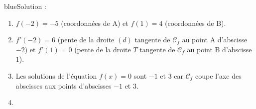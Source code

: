 \begin{color}{blue}Solution :\par
\begin{enumerate}
\item $f(-2) = -5$ (coordonnées de A) et $f(1) = 4$ (coordonnées de B).
\item $f'(-2) = 6$ (pente de la droite $(d)$ tangente de $\mathcal{C}_f$ au point A d'abscisse $-2$) et $f'(1) = 0$ (pente de la droite $T$ tangente de $\mathcal{C}_f$ au point B d'abscisse $1$).
\item Les solutions de l'équation $f(x)=0$ sont $-1$ et $3$ car $\mathcal{C}_f$ coupe l'axe des abscisses aux points d'abscisses  $-1$ et $3$.
\item \ {}


\end{enumerate}
\end{color}

